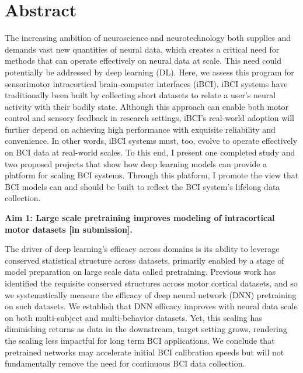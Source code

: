 \documentclass[12pt,oneside]{report}
\begin{document}
\section*{Abstract}
The increasing ambition of neuroscience and neurotechnology both supplies and demands vast new quantities of neural data, which creates a critical need for methods that can operate effectively on neural data at scale.
This need could potentially be addressed by deep learning (DL).
Here, we assess this program for sensorimotor intracortical brain-computer interfaces (iBCI). iBCI systems have traditionally been built by collecting short datasets to relate a user’s neural activity with their bodily state. Although this approach can enable both motor control and sensory feedback in research settings, iBCI's real-world adoption will further depend on achieving high performance with exquisite reliability and convenience. In other words, iBCI systems must, too, evolve to operate effectively on BCI data at real-world scales.
To this end, I present one completed study and two proposed projects that show how deep learning models can provide a platform for scaling BCI systems. Through this platform, I promote the view that BCI models can and should be built to reflect the BCI system's lifelong data collection.


\textbf{Aim 1: Large scale pretraining improves modeling of intracortical motor datasets [in submission].}

The driver of deep learning’s efficacy across domains is its ability to leverage conserved statistical structure across datasets, primarily enabled by a stage of model preparation on large scale data called pretraining. Previous work has identified the requisite conserved structures across motor cortical datasets, and so we systematically measure the efficacy of deep neural network (DNN) pretraining on such datasets. We establish that DNN efficacy improves with neural data scale on both multi-subject and multi-behavior datasets. Yet, this scaling has diminishing returns as data in the downstream, target setting grows, rendering the scaling less impactful for long term BCI applications. We conclude that pretrained networks may accelerate initial BCI calibration speeds but will not fundamentally remove the need for continuous BCI data collection.
\end{document}
